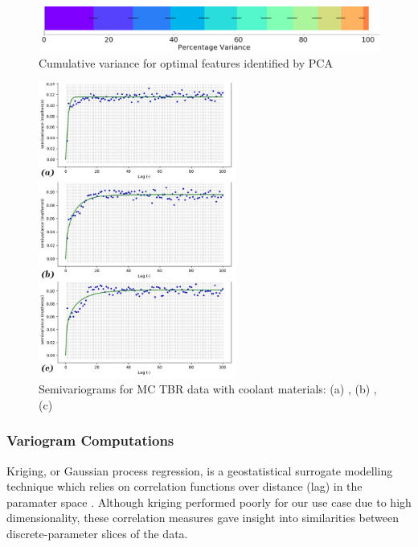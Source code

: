\begin{figure}[h]
  \centering
    \includegraphics[width=0.6\linewidth]{fig2_pca.jpg}
    \caption{Cumulative variance for optimal features identified by PCA}
  \label{fig:pca}
\end{figure}

\begin{figure}
  \vspace{-30pt}
  \begin{center}
    \hspace*{-.3\columnsep}\includegraphics[width=0.58\textwidth]{fig3_allvar.jpg}
	\caption{Semivariograms for MC TBR data with coolant materials: (a) ,
	(b) , (c) }
    \label{fig:var}
  \end{center}
  \vspace{-50pt}
\end{figure}

\subsubsection{Variogram Computations}

Kriging, or Gaussian process regression, is a geostatistical surrogate modelling technique which relies on correlation functions over distance (lag) in the paramater space \cite{Bouhlel2018}. Although kriging performed poorly for our use case due to high dimensionality, these correlation measures gave insight into similarities between discrete-parameter slices of the data.


